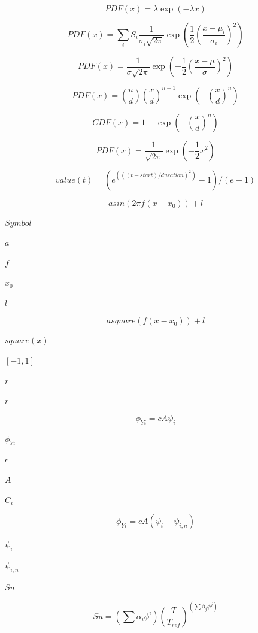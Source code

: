 \documentclass{article}
\begin{document}
\[
    PDF(x) = \lambda \exp(- \lambda x)
\]
\pagebreak

\[
    PDF(x) = \sum_i S_i \frac{1}{\sigma_i \sqrt{2 \pi}}  \exp \left( \frac{1}{2} \left( \frac{x - \mu_i}{\sigma_i}  \right)^2 \right)
\]
\pagebreak

\[
    PDF(x) = \frac{1}{\sigma \sqrt{2 \pi}} \exp  \left( - \frac{1}{2} \left( \frac{x - \mu}{\sigma} \right)^2 \right)
\]
\pagebreak

\[
    PDF(x) = \left( \frac{n}{d} \right) \left( \frac{x}{d} \right)^{n-1}  \exp \left( - \left(\frac{x}{d} \right)^n \right)
\]
\pagebreak

\[
    CDF(x) = 1 - \exp \left( - \left( \frac{x}{d} \right)^n \right)
\]
\pagebreak

\[
    PDF(x) = \frac{1}{\sqrt{2 \pi}} \exp \left( - \frac{1}{2} x^2 \right)
\]
\pagebreak

\[
    value(t) = (e^(((t - start)/duration)^2) - 1)/(e - 1)
\]
\pagebreak

\[
        a sin(2 \pi f (x - x_0)) + l
    \]
\pagebreak

$        Symbol  $
\pagebreak

$        a       $
\pagebreak

$        f       $
\pagebreak

$        x_0     $
\pagebreak

$        l       $
\pagebreak

\[
        a square(f (x - x_0) ) + l
    \]
\pagebreak

$square(x)$
\pagebreak

$[-1, 1]$
\pagebreak

$r$
\pagebreak

$        r       $
\pagebreak

\[
        \phi_{Yi} = c A \psi_i
    \]
\pagebreak

$            \phi_{Yi}  $
\pagebreak

$            c          $
\pagebreak

$            A          $
\pagebreak

$            C_i        $
\pagebreak

\[
        \phi_{Yi} = c A (\psi_i - \psi_{i,n})
    \]
\pagebreak

$            \psi_i     $
\pagebreak

$            \psi_{i,n} $
\pagebreak

$Su$
\pagebreak

\[
    Su = \left( \sum \alpha_i \phi^i \right)
    \left( \frac{T}{T_{ref}} \right)^{\left( \sum \beta_j \phi^j \right)}
\]
\pagebreak
\end{document}
